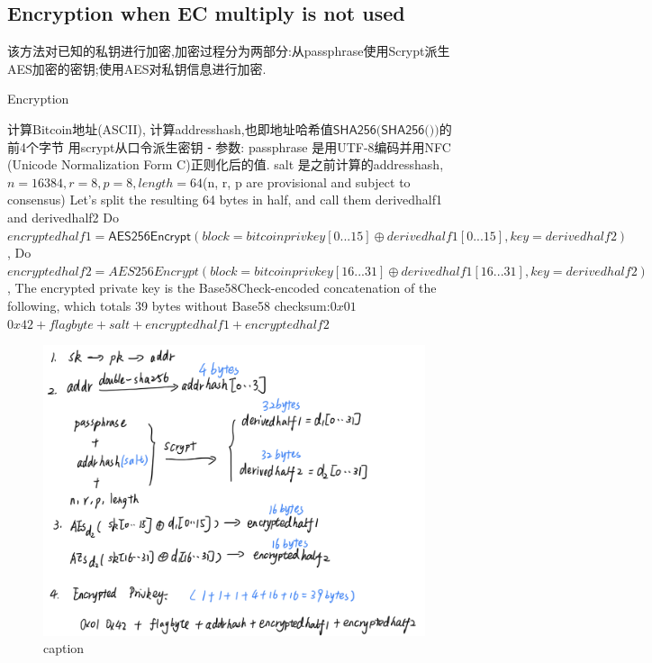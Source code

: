 \subsection{Encryption when EC multiply is not used}

该方法对已知的私钥进行加密,加密过程分为两部分:从passphrase使用Scrypt派生AES加密的密钥;使用AES对私钥信息进行加密.

\begin{algorithm}[tbp]\footnotesize
\caption{Encryption}\label{encryption without ec multiply}
  	\begin{algorithmic}[1]
	    \STATE 计算Bitcoin地址(ASCII), 计算addresshash,也即地址哈希值$\textsf{SHA256(SHA256())}$的前4个字节
		\STATE 用scrypt从口令派生密钥
	⁃	
		\STATE 参数: passphrase 是用UTF-8编码并用NFC (Unicode Normalization Form C)正则化后的值. 
		salt 是之前计算的addresshash, $n=16384, r=8, p=8, length=64 $(n, r, p are provisional and subject to consensus)  
		\STATE Let's split the resulting 64 bytes in half, and call them derivedhalf1 and derivedhalf2
		\STATE Do $encryptedhalf1 = \textsf{AES256Encrypt}(block = bitcoinprivkey[0...15] \oplus derivedhalf1[0...15], key = derivedhalf2)$,
		\STATE Do $encryptedhalf2 = AES256Encrypt(block = bitcoinprivkey[16...31] \oplus derivedhalf1[16...31], key = derivedhalf2)$, 
		\STATE The encrypted private key is the Base58Check-encoded concatenation of the following, which totals 39 bytes without Base58 checksum:$0x01$ $0x42 + flagbyte + salt + encryptedhalf1 + encryptedhalf2$
    \end{algorithmic}
\end{algorithm}

\begin{figure}[h]
\centering
\includegraphics[width=.7\textwidth]{./no-ec.png}
\caption{caption}\label{fig-parsesig}
\end{figure}

